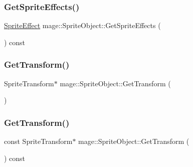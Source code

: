 \subsubsection{\texorpdfstring{Get\+Sprite\+Effects()}{GetSpriteEffects()}}
{\footnotesize\ttfamily \hyperlink{namespacemage_a9cfe18123066ba4236f548f9de75d881}{Sprite\+Effect} mage\+::\+Sprite\+Object\+::\+Get\+Sprite\+Effects (\begin{DoxyParamCaption}{ }\end{DoxyParamCaption}) const}

\hypertarget{classmage_1_1_sprite_object_ab48dfd7c6833067d67634bc89d7cb99c}{}\label{classmage_1_1_sprite_object_ab48dfd7c6833067d67634bc89d7cb99c} 
\subsubsection{\texorpdfstring{Get\+Transform()}{GetTransform()}\hspace{0.1cm}{\footnotesize\ttfamily [1/2]}}
{\footnotesize\ttfamily Sprite\+Transform$\ast$ mage\+::\+Sprite\+Object\+::\+Get\+Transform (\begin{DoxyParamCaption}{ }\end{DoxyParamCaption})}

\hypertarget{classmage_1_1_sprite_object_a73733c89ee3c47d0e8b8bb81a06bc48c}{}\label{classmage_1_1_sprite_object_a73733c89ee3c47d0e8b8bb81a06bc48c} 
\subsubsection{\texorpdfstring{Get\+Transform()}{GetTransform()}\hspace{0.1cm}{\footnotesize\ttfamily [2/2]}}
{\footnotesize\ttfamily const Sprite\+Transform$\ast$ mage\+::\+Sprite\+Object\+::\+Get\+Transform (\begin{DoxyParamCaption}{ }\end{DoxyParamCaption}) const}

\hypertarget{classmage_1_1_sprite_object_ac3ff1a1763e7fee3d6461cfd121bd5b2}{}\label{classmage_1_1_sprite_object_ac3ff1a1763e7fee3d6461cfd121bd5b2} 
